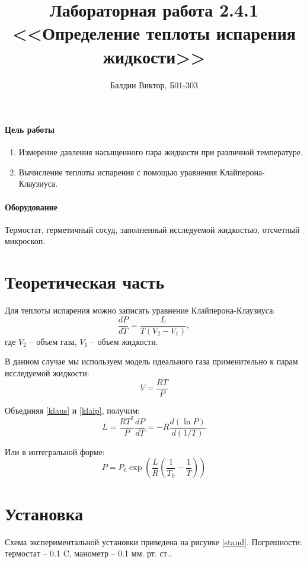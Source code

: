 \documentclass[12pt]{article}
\title{
    Лабораторная работа 2.4.1 \\
    <<Определение теплоты испарения жидкости>>
}
\author{Балдин Виктор, Б01-303}
\begin{document}
    \maketitle
    \paragraph{Цель работы}
    \begin{enumerate}
        \item Измерение давления насыщенного пара жидкости при различной
        температуре.
        \item Вычисление теплоты испарения с помощью уравнения Клайперона-
        Клаузиуса.
    \end{enumerate}
    \paragraph{Оборудование} Термостат, герметичный сосуд, заполненный
    исследуемой жидкостью, отсчетный микроскоп.

    \section{Теоретическая часть}
    Для теплоты испарения можно записать уравнение Клайперона-Клаузиуса:
    \begin{equation}
        \frac{dP}{dT} = \frac{L}{T(V_2 - V_1)},
        \label{klaus}
    \end{equation}
    где $V_2$ -- объем газа, $V_1$ -- объем жидкости.

    В данном случае мы используем модель идеального газа применительно
    к парам исследуемой жидкости:
    \begin{equation}
        V = \frac{RT}{P}
        \label{klaip}
    \end{equation}

    Объединяя \ref{klaus} и \ref{klaip}, получим:
    \begin{equation}
        L = \frac{RT^2}{P}\frac{dP}{dT} = -R\frac{d(\ln P)}{d(1 / T)}
        \label{L}
    \end{equation}

    Или в интегральной форме:
    \begin{equation}
        P = P_0 \exp \left(\frac{L}{R}\left(\frac{1}{T_0} - \frac{1}{T}\right)\right)
        \label{integral}
    \end{equation}

    \section{Установка}
    Схема экспериментальной установки приведена на рисунке \ref{stand}.
    Погрешности: термостат -- 0.1 \textdegree C, манометр -- 0.1 мм. рт. ст..
\end{document}
